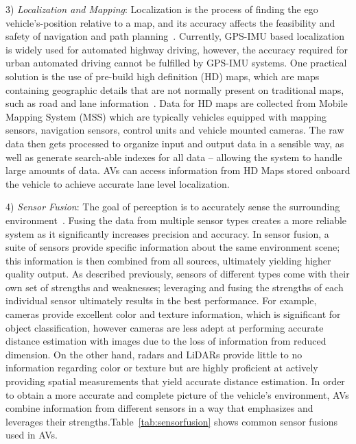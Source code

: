 \documentclass{article}
\begin{document}
3) \emph{Localization and Mapping}: Localization is the process of finding the ego vehicle’s-position relative to a map, and its accuracy affects the feasibility and safety of navigation and path planning~\cite{Dhongade2019}. Currently, GPS-IMU based localization is widely used for automated highway driving, however, the accuracy required for urban automated driving cannot be fulfilled by GPS-IMU systems. One practical solution is the use of pre-build high definition (HD) maps, which are maps containing geographic details that are not normally present on traditional maps, such as road and lane information~\cite{Daruthep2020}. Data for HD maps are collected from Mobile Mapping System (MSS) which are typically vehicles equipped with mapping sensors, navigation sensors, control units and vehicle mounted cameras. The raw data then gets processed to organize input and output data in a sensible way, as well as generate search-able indexes for all data -- allowing the system to handle large amounts of data. AVs can access information from HD Maps stored onboard the vehicle to achieve accurate lane level localization.

4) \emph{Sensor Fusion}: The goal of perception is to accurately sense the surrounding environment~\cite{Liu2021}. Fusing the data from multiple sensor types creates a more reliable system as it significantly increases precision and accuracy.  In sensor fusion, a suite of sensors provide specific information about the same environment scene; this information is then combined from all sources,  ultimately yielding higher quality output. As described previously, sensors of different types come with their own set of strengths and weaknesses; leveraging and fusing the strengths of each individual sensor ultimately results in the best performance. For example, cameras provide excellent color and texture information, which is significant for object classification, however  cameras are less adept at performing accurate distance estimation with images due to the loss  of information from reduced dimension. On the other hand, radars and LiDARs provide little to no information regarding color or texture but are highly proficient at actively providing spatial measurements that yield accurate distance estimation. In order to obtain a more accurate and complete picture of the vehicle’s environment, AVs combine information from different sensors in a way that emphasizes and leverages their strengths.Table~\ref{tab:sensorfusion} shows common sensor fusions used in AVs.
\end{document}
